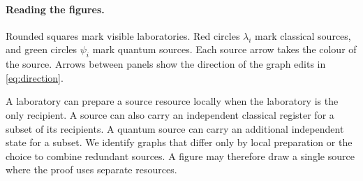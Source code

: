 \documentclass[11pt,a4paper]{article}
\begin{document}
\paragraph{Reading the figures.}
Rounded squares mark visible laboratories. Red circles \(\lambda_i\) mark
classical sources, and green circles \(\psi_i\) mark quantum sources. Each
source arrow takes the colour of the source. Arrows between panels show
the direction of the graph edits in \eqref{eq:direction}.

A laboratory can prepare a source resource locally when the laboratory is
the only recipient. A source can also carry an independent classical register
for a subset of its recipients. A quantum source can carry an additional
independent state for a subset. We identify graphs that differ only by
local preparation or the choice to combine redundant sources. A figure may therefore draw a single source where
the proof uses separate resources.




\end{document}
